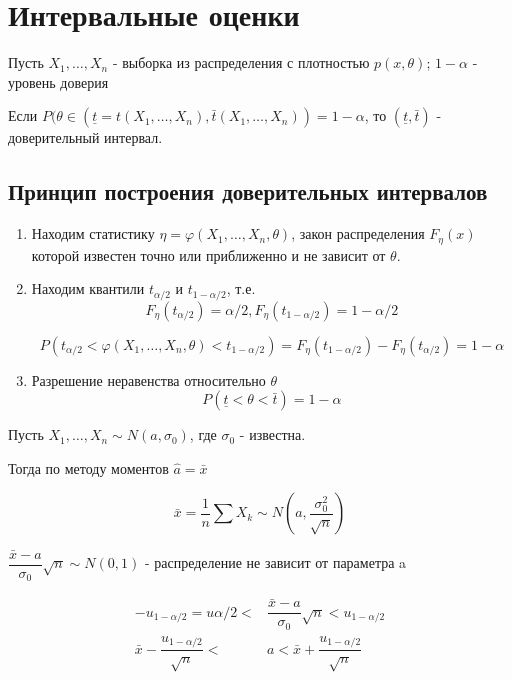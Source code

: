 \section{Интервальные оценки}

Пусть $X_1, \dots, X_n$ - выборка из распределения с плотностью $p(x, \theta)$; $1-\alpha$ - уровень доверия

\begin{definition}
  Если $P(\theta \in (\underline{t} = t(X_1, \dots, X_n), \bar t(X_1, \dots, X_n)) = 1-\alpha$, то $(\underline{t}, \bar t)$ - доверительный интервал.
\end{definition}

\subsection{Принцип построения доверительных интервалов}

\begin{enumerate}
  \item Находим статистику $\eta = \varphi(X_1, \dots, X_n, \theta)$, закон распределения $F_\eta (x)$ которой известен точно или приближенно и не зависит от $\theta$.
  \item Находим квантили $t_{\alpha/2}$ и $t_{1-\alpha/2}$, т.е.
    $$ F_\eta(t_{\alpha/2})  = \alpha/2, F_\eta(t_{1-\alpha/2}) = 1 - \alpha/2$$

    \[
      P(t_{\alpha/2} < \varphi(X_1, \dots, X_n, \theta) < t_{1-{\alpha/2}}) = F_\eta (t_{1 - \alpha/2}) - F_\eta (t_{\alpha/2}) = 1- \alpha
    \]
  \item Разрешение неравенства относительно $\theta$
    $$P(\underline{t} < \theta < \bar t) = 1-\alpha$$
\end{enumerate}

\begin{ex}
  Пусть $X_1, \dots, X_n \sim N(a, \sigma_0)$, где $\sigma_0$ - известна.

  Тогда по методу моментов $\hat a = \bar x$

  \[
    \bar x = \dfrac{1}{n} \sum X_k \sim N(a, \dfrac{\sigma_0^2}{\sqrt{n}})
  \]

  $\dfrac{\bar x - a}{\sigma_0} \sqrt{n} \sim N(0, 1)$ - распределение не зависит от параметра a

  \begin{align*}
    -u_{1-\alpha/2} = u{\alpha/2} < &\dfrac{\bar x - a}{\sigma_0} \sqrt{n} < u_{1-\alpha/2} \\
    \bar x - \dfrac{u_{1-\alpha/2}}{\sqrt{n}} < &a < \bar x + \dfrac{u_{1-\alpha/2}}{\sqrt{n}}
  \end{align*} 
 \end{ex}

